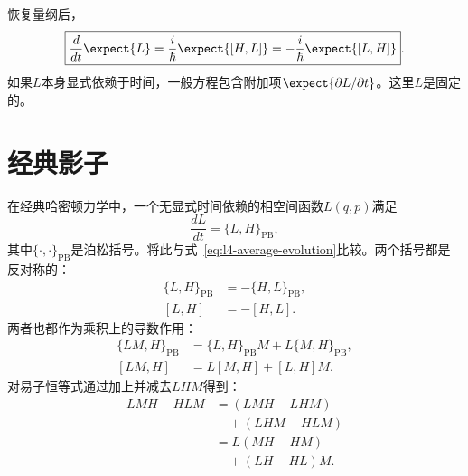 恢复量纲后，
\begin{equation}
\boxed{\frac{d}{dt}\expect{L}
=\frac{i}{\hbar}\expect{[H,L]}
=-\frac{i}{\hbar}\expect{[L,H]}}.
\label{eq:l4-average-evolution}
\end{equation}
如果\(L\)本身显式依赖于时间，一般方程包含附加项\(\expect{\partial L/\partial t}\)。这里\(L\)是固定的。

\begin{classroomqa}
\end{classroomqa}

\begin{classroomqa}
\end{classroomqa}

\section{经典影子}

在经典哈密顿力学中，一个无显式时间依赖的相空间函数\(L(q,p)\)满足
\begin{equation}
\frac{dL}{dt}=\{L,H\}_{\mathrm{PB}},
\label{eq:l4-poisson-evolution}
\end{equation}
其中\(\{\cdot,\cdot\}_{\mathrm{PB}}\)是泊松括号。将此与式~\eqref{eq:l4-average-evolution}比较。两个括号都是反对称的：
\begin{align}
\{L,H\}_{\mathrm{PB}}&=-\{H,L\}_{\mathrm{PB}},\\
[L,H]&=-[H,L].
\end{align}
两者也都作为乘积上的导数作用：
\begin{align}
\{LM,H\}_{\mathrm{PB}}
&=\{L,H\}_{\mathrm{PB}}M+L\{M,H\}_{\mathrm{PB}},\\
[LM,H]
&=L[M,H]+[L,H]M.
\label{eq:l4-commutator-product}
\end{align}
对易子恒等式通过加上并减去\(LHM\)得到：
\begin{align}
LMH-HLM
&=(LMH-LHM)\\
&\quad +(LHM-HLM)\\
&=L(MH-HM)\\
&\quad +(LH-HL)M.
\end{align}

